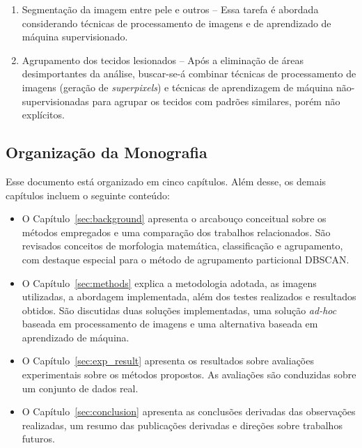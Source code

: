 \begin{enumerate}

\item Segmentação da imagem entre pele e outros -- Essa tarefa é abordada considerando técnicas de processamento de imagens e de aprendizado de máquina supervisionado. 

\item Agrupamento dos tecidos lesionados -- Após a eliminação de áreas desimportantes da análise, buscar-se-á combinar técnicas de processamento de imagens (geração de \textit{superpixels}) e técnicas de aprendizagem de máquina não-supervisionadas para agrupar os tecidos com padrões similares, porém não explícitos.

\end{enumerate}

\subsection{Organização da Monografia}
Esse documento está organizado em cinco capítulos.
Além desse, os demais capítulos incluem o seguinte conteúdo:
\begin{itemize}
    \item O Capítulo~\ref{sec:background} apresenta o arcabouço conceitual sobre os métodos empregados e uma comparação dos trabalhos relacionados.
    São revisados conceitos de morfologia matemática, classificação e agrupamento, com destaque especial para o método de agrupamento particional DBSCAN.
    \item O Capítulo~\ref{sec:methods} explica a metodologia adotada, as imagens utilizadas, a abordagem implementada, além dos testes realizados e resultados obtidos.
    São discutidas duas soluções implementadas, uma solução \textit{ad-hoc} baseada em processamento de imagens e uma alternativa baseada em aprendizado de máquina.
    \item O Capítulo~\ref{sec:exp_result} apresenta os resultados sobre avaliações experimentais sobre os métodos propostos.
    As avaliações são conduzidas sobre um conjunto de dados real.
    \item O Capítulo~\ref{sec:conclusion} apresenta as conclusões derivadas das observações realizadas, um resumo das publicações derivadas e direções sobre trabalhos futuros.
\end{itemize}

